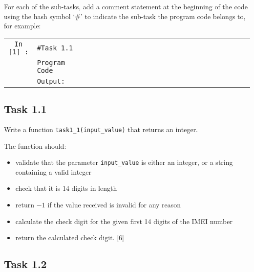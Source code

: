 For each of the sub-tasks, add a comment statement at the beginning
of the code using the hash symbol \textquoteleft \#' to indicate the
sub-task the program code belongs to, for example:

\begin{singlespace}
\noindent \texttt{}%
\begin{tabular}{c|lcccccccccccccccccccccc|}
\cline{2-24} \cline{3-24} \cline{4-24} \cline{5-24} \cline{6-24} \cline{7-24} \cline{8-24} \cline{9-24} \cline{10-24} \cline{11-24} \cline{12-24} \cline{13-24} \cline{14-24} \cline{15-24} \cline{16-24} \cline{17-24} \cline{18-24} \cline{19-24} \cline{20-24} \cline{21-24} \cline{22-24} \cline{23-24} \cline{24-24} 
\texttt{In {[}1{]} :} & \texttt{\#Task 1.1} &  &  &  &  &  &  &  &  &  &  &  &  &  &  &  &  &  &  &  &  &  & \tabularnewline
 & \texttt{Program Code} &  &  &  &  &  &  &  &  &  &  &  &  &  &  &  &  &  &  &  &  &  & \tabularnewline
\cline{2-24} \cline{3-24} \cline{4-24} \cline{5-24} \cline{6-24} \cline{7-24} \cline{8-24} \cline{9-24} \cline{10-24} \cline{11-24} \cline{12-24} \cline{13-24} \cline{14-24} \cline{15-24} \cline{16-24} \cline{17-24} \cline{18-24} \cline{19-24} \cline{20-24} \cline{21-24} \cline{22-24} \cline{23-24} \cline{24-24} 
\multicolumn{1}{c}{} & \texttt{Output:} &  &  &  &  &  &  &  &  &  &  &  &  &  &  &  &  &  &  &  &  &  & \multicolumn{1}{c}{}\tabularnewline
\end{tabular}
\end{singlespace}
\begin{singlespace}

\subsection*{Task 1.1}
\end{singlespace}

Write a function \texttt{task1\_1(input\_value)} that returns an integer.

The function should:
\begin{itemize}
\item validate that the parameter \texttt{input\_value} is either an integer,
or a string containing a valid integer
\item check that it is 14 digits in length
\item return $-1$ if the value received is invalid for any reason
\item calculate the check digit for the given first 14 digits of the IMEI
number
\item return the calculated check digit. \hfill{}{[}6{]}
\end{itemize}
\begin{singlespace}

\subsection*{Task 1.2}
\end{singlespace}

